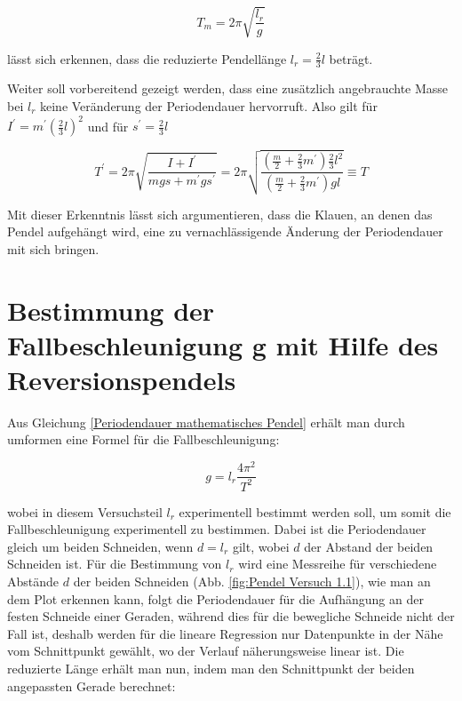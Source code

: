 \begin{equation} \label{Periodendauer mathematisches Pendel}
   T_m = 2 \pi \sqrt{\frac{l_r}{g}} 
\end{equation} 

lässt sich erkennen, dass die reduzierte Pendellänge $l_r = \frac{2}{3}l$ beträgt.

Weiter soll vorbereitend gezeigt werden, dass eine zusätzlich angebrauchte Masse bei $l_r$  keine Veränderung der Periodendauer hervorruft. Also gilt für $I^\prime = m^\prime (\frac{2}{3}l)^2$ und für $s^\prime = \frac{2}{3}l$

\begin{equation}
    T^\prime = 2 \pi \sqrt{\frac{I + I^\prime}{mgs+m^\prime g s^\prime }} = 2\pi \sqrt{ \frac{ (\frac{m}{2} + \frac{2}{3} m^\prime) \frac{2}{3}l^2} { (\frac{m}{2} + \frac{2}{3}m^\prime)g l  }} \equiv T
\end{equation}

Mit dieser Erkenntnis lässt sich argumentieren, dass die Klauen, an denen das Pendel aufgehängt wird, eine zu vernachlässigende Änderung der Periodendauer mit sich bringen.

\section{Bestimmung der Fallbeschleunigung g mit Hilfe des Reversionspendels}

Aus Gleichung \ref{Periodendauer mathematisches Pendel} erhält man durch umformen eine Formel für die Fallbeschleunigung: 

\begin{equation} \label{Fallbeschleunigung mathematisches Pendel}
    g = l_r \frac{4 \pi^2}{T^2}
\end{equation}

wobei in diesem Versuchsteil $l_r$ experimentell bestimmt werden soll, um somit die Fallbeschleunigung experimentell zu bestimmen. Dabei ist die Periodendauer gleich um beiden Schneiden, wenn $d = l_r$ gilt, wobei $d$ der Abstand der beiden Schneiden ist. Für die Bestimmung von $l_r$ wird eine Messreihe für verschiedene Abstände $d$ der beiden Schneiden (Abb. \ref{fig:Pendel Versuch 1.1}), wie man an dem Plot erkennen kann, folgt die Periodendauer für die Aufhängung an der festen Schneide einer Geraden, während dies für die bewegliche Schneide nicht der Fall ist, deshalb werden für die lineare Regression nur Datenpunkte in der Nähe vom Schnittpunkt gewählt, wo der Verlauf näherungsweise linear ist. Die reduzierte Länge erhält man nun, indem man den Schnittpunkt der beiden angepassten Gerade berechnet:

